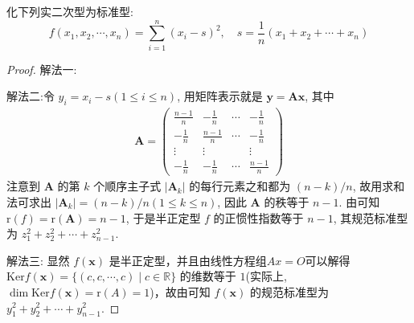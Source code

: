 \documentclass[../../main.tex]{subfiles}
\begin{document}
\begin{example}\label{example:例8.34}
化下列实二次型为标准型:
\[f(x_1,x_2,\cdots,x_n)=\sum_{i = 1}^{n}(x_i - s)^2, \quad s = \frac{1}{n}(x_1 + x_2 + \cdots + x_n)\]
\end{example}
\begin{proof}
{\color{blue}解法一:}

{\color{blue}解法二:}令 \(y_i = x_i - s(1\leqslant  i\leqslant  n)\), 用矩阵表示就是 \(\boldsymbol{y} = \boldsymbol{A}\boldsymbol{x}\), 其中
\begin{align*}
\boldsymbol{A} = \begin{pmatrix}
\frac{n - 1}{n} & -\frac{1}{n} & \cdots & -\frac{1}{n} \\
-\frac{1}{n} & \frac{n - 1}{n} & \cdots & -\frac{1}{n} \\
\vdots & \vdots & & \vdots \\
-\frac{1}{n} & -\frac{1}{n} & \cdots & \frac{n - 1}{n}
\end{pmatrix}
\end{align*}
注意到 \(\boldsymbol{A}\) 的第 \(k\) 个顺序主子式 \(|\boldsymbol{A}_k|\) 的每行元素之和都为 \((n - k)/n\), 故用求和法可求出 \(|\boldsymbol{A}_k| = (n - k)/n(1\leqslant  k\leqslant  n)\), 因此 \(\boldsymbol{A}\) 的秩等于 \(n - 1\). 由可知 \(\mathrm{r}(f)=\mathrm{r}(\boldsymbol{A}) = n - 1\), 于是半正定型 \(f\) 的正惯性指数等于 \(n - 1\), 其规范标准型为 \(z_1^2 + z_2^2 + \cdots + z_{n - 1}^2\).

{\color{blue}解法三:}
显然 $f(\boldsymbol{x})$ 是半正定型，并且由线性方程组$Ax=O$可以解得 $\mathrm{Ker} f(\boldsymbol{x})=\{(c,c,\cdots,c)\mid c\in\mathbb{R}\}$ 的维数等于 $1$(实际上,$\dim \mathrm{Ker} f(\boldsymbol{x})=\mathrm{r}(A)=1$)，故由可知 $f(\boldsymbol{x})$ 的规范标准型为 $y_1^2 + y_2^2+\cdots + y_{n - 1}^2$.  

\end{proof}
\end{document}
